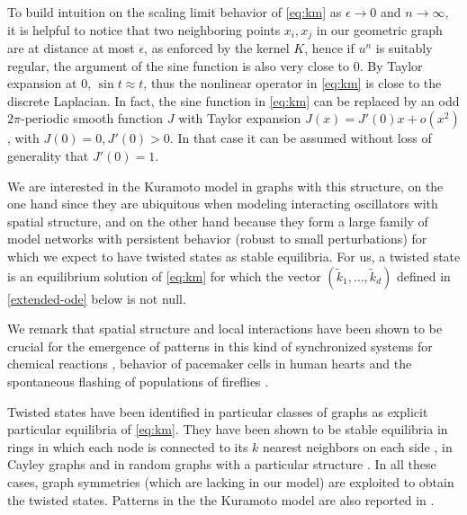 \documentclass[a4paper,11pt]{amsart}
\newcommand{\red}[1]{{#1}}
\newcommand{\R}{\mathbb{R}}
\newcommand{\T}{\mathbb{T}}
\newcommand{\Z}{\mathbb{Z}}
\newcommand{\ep}{\epsilon}
\newcommand{\patu}[1]{{{\color{red}#1}}}
\newcommand{\hernan}[1]{{{\color{magenta}#1}}}
\numberwithin{equation}{section}
\numberwithin{theorem}{section}
\theoremstyle{definition}
\begin{document}
To build intuition on the scaling limit behavior of \eqref{eq:km} as $\ep\to0$ and $n\to\infty$, it is helpful to notice that two neighboring points $x_i,x_j$ in our geometric graph are at distance at most $\ep$, as enforced by the kernel $K$, hence if $u^n$ is suitably regular, the argument of the sine function is also very close to $0$. By Taylor expansion at $0$, $\sin t \approx t$, thus the nonlinear operator in \eqref{eq:km} is close to the discrete Laplacian. In fact,
the sine function in \eqref{eq:km} can be replaced by an odd $2\pi$-periodic smooth function $J$ with Taylor expansion $J(x)= J'(0)x + o(x^2)$, with $J(0)=0, J'(0) > 0$. In that case it can be assumed without loss of generality that $J' (0)=1$.

We are interested in the Kuramoto model in graphs with this structure, on the one hand since they are ubiquitous when modeling interacting oscillators with spatial structure, and on the other hand because they form a large family of model networks with persistent behavior (robust to small perturbations) for which we expect to have twisted states as stable equilibria. For us, a twisted state is an equilibrium solution of \eqref{eq:km} for which the vector $(\tilde k_1, \dots, \tilde k_d)$ defined in \eqref{extended-ode} below is not null.

We remark that spatial structure and local interactions have been shown to be crucial for the emergence of patterns in this kind of synchronized systems for chemical reactions \cite{winfree1984organizing}, behavior of pacemaker cells in human hearts \cite{peskin1975mathematical} and the spontaneous flashing of populations of fireflies \cite{mirollo1990synchronization}.

Twisted states have been identified in particular classes of graphs as explicit particular equilibria of \eqref{eq:km}. They have been shown to be stable equilibria in rings in which each node is connected to its $k$ nearest neighbors on each side \cite{wiley2006size}, in Cayley graphs and in random graphs with a particular structure \cite{MedvedevStability}. In all these cases, graph symmetries (which are lacking in our model) are exploited to obtain the twisted states. Patterns in the the Kuramoto model are also reported in \cite{chiba2022instability}.
\end{document}
